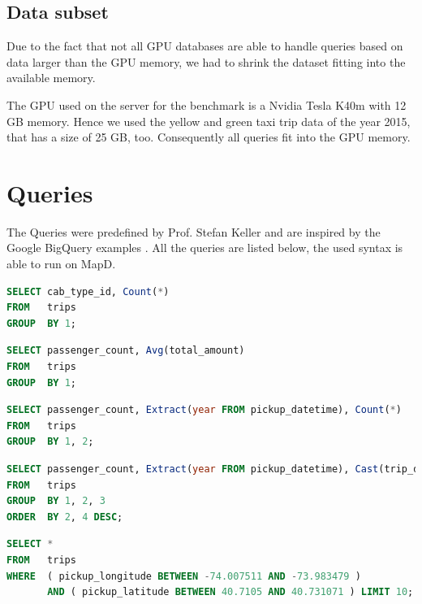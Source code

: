 \subsection{Data subset}
Due to the fact that not all GPU databases are able to handle queries based on data larger than the GPU memory,
we had to shrink the dataset fitting into the available memory.

The GPU used on the server for the benchmark is a Nvidia Tesla K40m with 12 GB memory.
Hence we used the yellow and green taxi trip data of the year 2015, that has a size of 25 GB, too.
Consequently all queries fit into the GPU memory.


\newpage
\section{Queries}
\label{sec:queries}
The Queries were predefined by Prof. Stefan Keller and are inspired by the Google BigQuery examples \cite{bigquery}.
All the queries are listed below, the used syntax is able to run on MapD. \\


\begin{lstlisting}[language=sql, caption={Query 1, Counts all the yellow taxi trips},captionpos=b]
SELECT cab_type_id, Count(*)
FROM   trips
GROUP  BY 1;
\end{lstlisting}


\begin{lstlisting}[language=sql, caption={Query 2, Calculates the average passenger amount per trip},captionpos=b]
SELECT passenger_count, Avg(total_amount)
FROM   trips
GROUP  BY 1;
\end{lstlisting}

\begin{lstlisting}[language=sql, caption={Query 3, Sums the yearly amount of passengers},captionpos=b]
SELECT passenger_count, Extract(year FROM pickup_datetime), Count(*)
FROM   trips
GROUP  BY 1, 2;
\end{lstlisting}


\begin{lstlisting}[language=sql, caption={Query 4, Groups the amount of passenger by year regarding the trip distance},captionpos=b]
SELECT passenger_count, Extract(year FROM pickup_datetime), Cast(trip_distance AS INT), Count(*)
FROM   trips
GROUP  BY 1, 2, 3
ORDER  BY 2, 4 DESC;
\end{lstlisting}

\begin{lstlisting}[language=sql, caption={Query 5, Queries all trips in a certain bounding box},captionpos=b]
SELECT *
FROM   trips
WHERE  ( pickup_longitude BETWEEN -74.007511 AND -73.983479 )
       AND ( pickup_latitude BETWEEN 40.7105 AND 40.731071 ) LIMIT 10;
\end{lstlisting}


